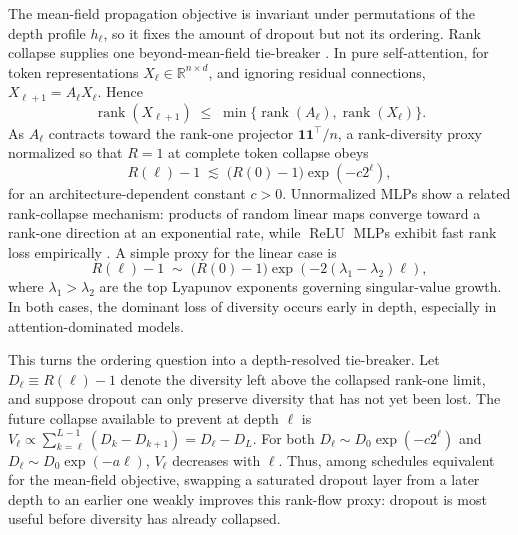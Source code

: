 \documentclass{article}
\DeclareMathOperator{\ReLU}{ReLU}
\newcommand{\relu}{\ensuremath{\ReLU}}
\theoremstyle{plain}
\theoremstyle{definition}
\theoremstyle{remark}
\begin{document}
The mean-field propagation objective is invariant under permutations of the depth profile \(h_\ell\), so it fixes the amount of dropout but not its ordering. Rank collapse supplies one beyond-mean-field tie-breaker \cite{dong2021attention,noci2022signalpropagation,daneshmand2020batch}. In pure self-attention, for token representations \(X_\ell\in\mathbb R^{n\times d}\), and ignoring residual connections, \(X_{\ell+1}=A_\ell X_\ell\). Hence
\relax
\begin{equation}
\operatorname{rank}(X_{\ell+1}) \;\leq\; \min\{\operatorname{rank}(A_\ell),\operatorname{rank}(X_\ell)\}.
\end{equation}
\relax
As \(A_\ell\) contracts toward the rank-one projector \(\mathbf 1\mathbf 1^\top/n\), a rank-diversity proxy normalized so that \(R=1\) at complete token collapse obeys
\relax
\begin{equation}
R(\ell)-1 \;\lesssim\; \bigl(R(0)-1\bigr)\exp\left(-c 2^\ell\right),
\end{equation}
\relax
for an architecture-dependent constant \(c>0\). Unnormalized MLPs show a related rank-collapse mechanism: products of random linear maps converge toward a rank-one direction at an exponential rate, while \relu{} MLPs exhibit fast rank loss empirically \cite{daneshmand2020batch}. A simple proxy for the linear case is
\relax
\begin{equation}
R(\ell)-1 \;\sim\; \bigl(R(0)-1\bigr)\exp\left(-2(\lambda_1-\lambda_2) \ell\right),
\end{equation}
\relax
where $\lambda_1>\lambda_2$ are the top Lyapunov exponents governing singular-value growth. In both cases, the dominant loss of diversity occurs early in depth, especially in attention-dominated models.

This turns the ordering question into a depth-resolved tie-breaker. Let \(D_\ell\equiv R(\ell)-1\) denote the diversity left above the collapsed rank-one limit, and suppose dropout can only preserve diversity that has not yet been lost. The future collapse available to prevent at depth \(\ell\) is \(V_\ell\propto \sum_{k=\ell}^{L-1}(D_k-D_{k+1})=D_\ell-D_L\). For both \(D_\ell\sim D_0\exp(-c2^\ell)\) and \(D_\ell\sim D_0\exp(-a\ell)\), \(V_\ell\) decreases with \(\ell\). Thus, among schedules equivalent for the mean-field objective, swapping a saturated dropout layer from a later depth to an earlier one weakly improves this rank-flow proxy: dropout is most useful before diversity has already collapsed.
\end{document}
